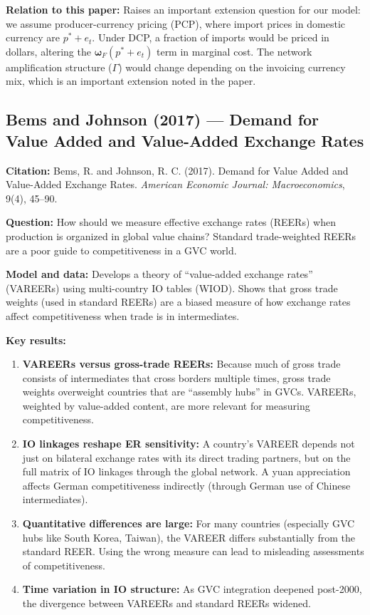 \documentclass[12pt]{article}
\begin{document}
\textbf{Relation to this paper:} Raises an important extension question for our model: we assume producer-currency pricing (PCP), where import prices in domestic currency are $p^* + e_t$. Under DCP, a fraction of imports would be priced in dollars, altering the $\bm{\omega}_F(p^* + e_t)$ term in marginal cost. The network amplification structure ($\Gamma$) would change depending on the invoicing currency mix, which is an important extension noted in the paper.

\subsection{Bems and Johnson (2017) --- Demand for Value Added and Value-Added Exchange Rates}

\textbf{Citation:} Bems, R. and Johnson, R. C. (2017). Demand for Value Added and Value-Added Exchange Rates. \textit{American Economic Journal: Macroeconomics}, 9(4), 45--90.

\textbf{Question:} How should we measure effective exchange rates (REERs) when production is organized in global value chains? Standard trade-weighted REERs are a poor guide to competitiveness in a GVC world.

\textbf{Model and data:} Develops a theory of ``value-added exchange rates'' (VAREERs) using multi-country IO tables (WIOD). Shows that gross trade weights (used in standard REERs) are a biased measure of how exchange rates affect competitiveness when trade is in intermediates.

\textbf{Key results:}
\begin{enumerate}
    \item \textbf{VAREERs versus gross-trade REERs:} Because much of gross trade consists of intermediates that cross borders multiple times, gross trade weights overweight countries that are ``assembly hubs'' in GVCs. VAREERs, weighted by value-added content, are more relevant for measuring competitiveness.
    \item \textbf{IO linkages reshape ER sensitivity:} A country's VAREER depends not just on bilateral exchange rates with its direct trading partners, but on the full matrix of IO linkages through the global network. A yuan appreciation affects German competitiveness indirectly (through German use of Chinese intermediates).
    \item \textbf{Quantitative differences are large:} For many countries (especially GVC hubs like South Korea, Taiwan), the VAREER differs substantially from the standard REER. Using the wrong measure can lead to misleading assessments of competitiveness.
    \item \textbf{Time variation in IO structure:} As GVC integration deepened post-2000, the divergence between VAREERs and standard REERs widened.
\end{enumerate}
\end{document}
